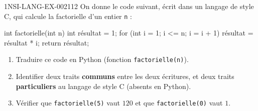 \begin{exercice}{1NSI-LANG-EX-002}{1}{12}
On donne le code suivant, écrit dans un langage de style C, qui calcule la factorielle d'un
entier \lstinline{n} :
\begin{console}
int factorielle(int n) {
    int résultat = 1;
    for (int i = 1; i <= n; i = i + 1) {
        résultat = résultat * i;
    }
    return résultat;
}
\end{console}
\begin{enumerate}
  \item Traduire ce code en Python (fonction \lstinline{factorielle(n)}).
  \item Identifier deux traits \textbf{communs} entre les deux écritures, et deux traits \textbf{particuliers} au langage de style C (absents en Python).
  \item Vérifier que \lstinline{factorielle(5)} vaut $120$ et que \lstinline{factorielle(0)} vaut $1$.
\end{enumerate}
\end{exercice}
